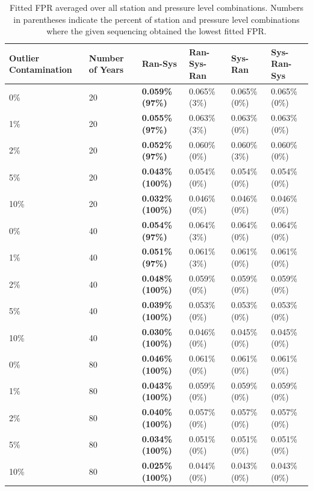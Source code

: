 \documentclass[12pt]{article}
\begin{document}
\begin{landscape}
\begin{table}[ht]
	\centering
	\begin{tabular}{ll|llll}
		\hline
		Outlier Contamination & Number of Years & Ran-Sys & Ran-Sys-Ran & Sys-Ran & Sys-Ran-Sys \\ 
		\hline
		0\% & 20 & \textbf{0.059\% (97\%)} & 0.065\% (3\%) & 0.065\% (0\%) & 0.065\% (0\%) \\ 
		1\% & 20 & \textbf{0.055\% (97\%)} & 0.063\% (3\%) & 0.063\% (0\%) & 0.063\% (0\%) \\ 
		2\% & 20 & \textbf{0.052\% (97\%)} & 0.060\% (0\%) & 0.060\% (3\%) & 0.060\% (0\%) \\ 
		5\% & 20 & \textbf{0.043\% (100\%)} & 0.054\% (0\%) & 0.054\% (0\%) & 0.054\% (0\%) \\ 
		10\% & 20 & \textbf{0.032\% (100\%)} & 0.046\% (0\%) & 0.046\% (0\%) & 0.046\% (0\%) \\ 
		\hline
		0\% & 40 & \textbf{0.054\% (97\%)} & 0.064\% (3\%) & 0.064\% (0\%) & 0.064\% (0\%) \\ 
		1\% & 40 & \textbf{0.051\% (97\%)} & 0.061\% (3\%) & 0.061\% (0\%) & 0.061\% (0\%) \\ 
		2\% & 40 & \textbf{0.048\% (100\%)} & 0.059\% (0\%) & 0.059\% (0\%) & 0.059\% (0\%) \\ 
		5\% & 40 & \textbf{0.039\% (100\%)} & 0.053\% (0\%) & 0.053\% (0\%) & 0.053\% (0\%) \\ 
		10\% & 40 & \textbf{0.030\% (100\%)} & 0.046\% (0\%) & 0.045\% (0\%) & 0.045\% (0\%) \\ 
		\hline
		0\% & 80 & \textbf{0.046\% (100\%)} & 0.061\% (0\%) & 0.061\% (0\%) & 0.061\% (0\%) \\ 
		1\% & 80 & \textbf{0.043\% (100\%)} & 0.059\% (0\%) & 0.059\% (0\%) & 0.059\% (0\%) \\ 
		2\% & 80 & \textbf{0.040\% (100\%)} & 0.057\% (0\%) & 0.057\% (0\%) & 0.057\% (0\%) \\ 
		5\% & 80 & \textbf{0.034\% (100\%)} & 0.051\% (0\%) & 0.051\% (0\%) & 0.051\% (0\%) \\ 
		10\% & 80 & \textbf{0.025\% (100\%)} & 0.044\% (0\%) & 0.043\% (0\%) & 0.043\% (0\%) \\ 
		\hline
	\end{tabular}
	\caption{Fitted FPR averaged over all station and pressure level combinations.  Numbers in parentheses indicate the percent of station and pressure level combinations where the given sequencing obtained the lowest fitted FPR.}
	\label{tab:fitFPR}
\end{table}
\end{landscape}
\end{document}
